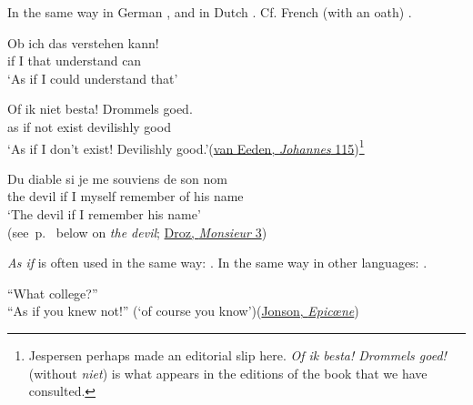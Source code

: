 In the same way in German , and in Dutch . Cf. French (with an oath) .

\ea \label{ex:04-100}
\gll Ob ich das verstehen kann!\\
 if I that understand can\\
 \glt `As if I could understand that'
\z

\ea \label{ex:04-101}
\gll Of ik niet besta! Drommels goed.\\
 as if not exist devilishly good\\
\glt `As if I don't exist! Devilishly good.'\hfill(\href{}{van Eeden, \textit{Johannes} 115})\footnote{Jespersen perhaps made an editorial slip here. \textit{Of ik besta! Drommels goed!} (without \textit{niet}) is what appears in the editions of the book that we have consulted. \eds} %
\z

\ea \label{ex:04-102}
\gll Du diable si je me souviens de son nom\\
 the devil if I myself remember of his name\\
\glt `The devil if I remember his name'
\\\hfill(see~p.~\pageref{sec:the-devil} below on \textit{the devil}; \href{https://gallica.bnf.fr/ark:/12148/bpt6k64180x.pdf}{Droz, \textit{Monsieur} 3})%
\z

\textit{As if} is often used in the same way: . In the same way in other languages: .

\ea \label{ex:04-103}
``What college?''\\``As if you knew not!'' \phantom{x} (`of course you know')\hfill(\href{https://archive.org/details/in.ernet.dli.2015.46505/page/n5/mode/2up?q=\%22What+college%3F\%22&view=theater}{Jonson, \textit{Epicœne}})
\z

